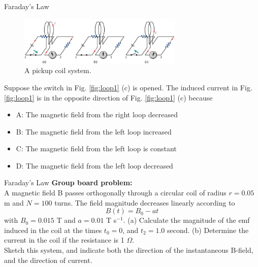 \documentclass{beamer}
\begin{document}
\begin{frame}{Faraday's Law}
\small
\begin{figure}
\centering
\includegraphics[width=0.7\textwidth]{figures/farad2.png}
\caption{\label{fig:loop4} A pickup coil system.}
\end{figure}
Suppose the switch in Fig. \ref{fig:loop1} (c) is opened.  The induced current in Fig. \ref{fig:loop1} is in the opposite direction of Fig. \ref{fig:loop1} (c) because
\begin{itemize}
\item A: The magnetic field from the right loop decreased
\item B: The magnetic field from the left loop increased
\item C: The magnetic field from the left loop is constant
\item D: The magnetic field from the left loop decreased
\end{itemize}
\end{frame}

\begin{frame}{Faraday's Law}
\small
\textbf{Group board problem:} \\ \vspace{0.5cm}
A magnetic field B passes orthogonally through a circular coil of radius $r = 0.05$ m and $N = 100$ turns.  The field magnitude decreases linearly according to
\begin{equation}
B(t) = B_0 - a t
\end{equation}
with $B_0 = 0.015$ T and $a = 0.01$ T s$^{-1}$.  (a) Calculate the magnitude of the emf induced in the coil at the times $t_0 = 0$, and $t_2 = 1.0$ second. (b) Determine the current in the coil if the resistance is 1 $\Omega$. \\ \vspace{0.5cm}
Sketch this system, and indicate both the direction of the instantaneous B-field, and the direction of current.
\end{frame}
\end{document}
